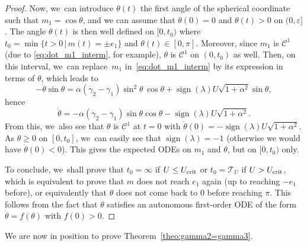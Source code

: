 \documentclass[JEP,XML,SOM,Unicode,NoEqCountersInSection,NoFloatCountersInSection,published]{cedram}
\theoremstyle{definition}
\begin{document}
\begin{proof}
Now, we~can introduce $\theta (t)$ the first angle of the spherical coordinate such that $m_1 = \cos \theta$, and we can assume that $\theta (0) = 0$ and $\theta (t) > 0$ on $(0, \varepsilon]$. The angle $\theta (t)$ is then well defined on $[0, t_0)$ where $t_0 = \min \{ t > 0 \, | \, m(t) = \pm e_1 \}$ and $\theta (t) \in [0, \pi]$. Moreover, since $m_1$ is $\mathscr{C}^1$ (due to \eqref{eq:dot_m1_interm}, for example), $\theta$ is $\mathscr{C}^1$ on $(0, t_0)$ as well.
Then, on this interval, we~can replace~$m_1$ in~\eqref{eq:dot_m1_interm} by its expression in terms of $\theta$, which leads to
\begin{equation*}
- \dot{\theta} \sin{\theta} = \alpha (\gamma_2 - \gamma_1) \sin^2 \theta \, \cos{\theta} + \operatorname{sign} (\lambda) U \sqrt{1 + \alpha^2} \sin{\theta},
\end{equation*}
hence
\begin{equation*}
\dot{\theta} = - \alpha (\gamma_2 - \gamma_1) \sin{\theta} \cos{\theta} - \operatorname{sign} (\lambda) U \sqrt{1 + \alpha^2}.
\end{equation*}
From this, we~also see that $\theta$ is $\mathscr{C}^1$ at $t = 0$ with $\dot{\theta} (0) = - \operatorname{sign} (\lambda) U \sqrt{1 + \alpha^2}$.
As $\theta \geq 0$ on $[0, t_0]$, we~can easily see that $\operatorname{sign} (\lambda) = -1$ (otherwise we would have $\dot{\theta} (0) < 0$). This gives the expected ODEs on $m_1$ and $\theta$, but on $[0, t_0)$ only.

To conclude, we~shall prove that $t_0 = \infty$ if $U \leq U_\textnormal{crit}$ or $t_0 = \mathcal{T}_U$ if $U > U_\textnormal{crit}$, which is equivalent to prove that $m$ does not reach $e_1$ again (up to reaching $-e_1$ before), or equivalently that $\theta$ does not come back to $0$ before reaching $\pi$. This follows from the fact that $\theta$ satisfies an autonomous first-order ODE of the form $\dot \theta = f(\theta)$ with $f(0) > 0$.
\end{proof}

We are now in position to prove Theorem~\ref{theo:gamma2=gamma3}.
\end{document}
